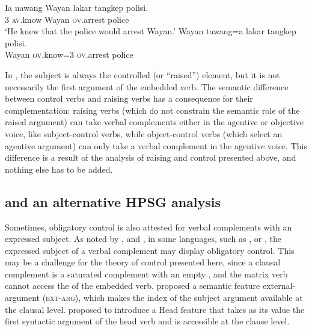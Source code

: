 \ex
\label{ov}
\gll Ia nawang           Wayan lakar  tangkep            polisi.\\
     3  \textsc{av}.know Wayan \FUT{} \textsc{ov}.arrest police\\
\glt `He knew that the police would arrest Wayan.'
\ex
\label{rais-ov}
\gll Wayan tawang=a           lakar  tangkep            polisi. \\
     Wayan \textsc{ov}.know=3 \FUT{} \textsc{ov}.arrest police\\ 
\zl


In , the subject is always the controlled (or ``raised'') element, but it is not
necessarily the first argument of the embedded verb. The semantic difference between control verbs
and raising verbs has a consequence for their complementation: raising verbs (which do not constrain
the semantic role of the raised argument) can take verbal complements either in the agentive or
objective voice, like subject-control verbs, while object-control verbs (which select an agentive argument) can only take a
verbal complement in the agentive voice. This difference is a result of the analysis of raising and
control presented above, and nothing else has to be added.



\subsection{\xarg and an alternative HPSG analysis}\label{section-xarg}

\largerpage
Sometimes, obligatory control is also attested for verbal complements with an expressed subject.  As
noted by \citet{Zec87a-u}, \citet{Farkas1988} and \citet[--116]{GH2001a-u}, in some languages, such
as ,  \citep{Kuno76a-u,Iida96a-u} or  \citep{Karimi2008},
the expressed subject of a verbal complement may display obligatory control. This may be a challenge
for the theory of control presented here, since a clausal complement is a saturated complement with
an empty \subjl, and the matrix verb cannot access the \subjv of the embedded verb. \citet[]{SP91a-u} proposed a semantic feature external-argument (\textsc{ext-arg}), which makes the index of the
subject argument available at the clausal level.  \citet[409]{Sag2007a} proposed to introduce a Head
feature \xarg that takes as its value the first syntactic argument of the head verb and is
accessible at the clause level.

